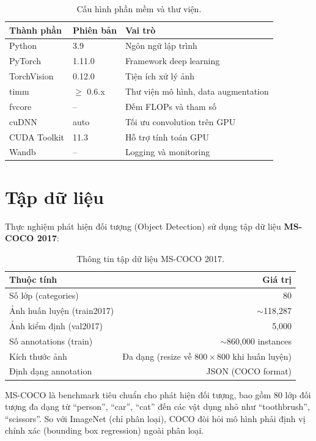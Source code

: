 \begin{table}[H]
\centering
\caption{Cấu hình phần mềm và thư viện.}
\label{tab:software}
\begin{tabular}{l l l}
\toprule
\textbf{Thành phần} & \textbf{Phiên bản} & \textbf{Vai trò} \\
\midrule
Python & 3.9 & Ngôn ngữ lập trình \\
PyTorch & 1.11.0 & Framework deep learning \\
TorchVision & 0.12.0 & Tiện ích xử lý ảnh \\
timm & $\geq$ 0.6.x & Thư viện mô hình, data augmentation \\
fvcore & -- & Đếm FLOPs và tham số \\
cuDNN & auto & Tối ưu convolution trên GPU \\
CUDA Toolkit & 11.3 & Hỗ trợ tính toán GPU \\
Wandb & -- & Logging và monitoring \\
\bottomrule
\end{tabular}
\end{table}

\section{Tập dữ liệu}
\label{sec:dataset}

Thực nghiệm phát hiện đối tượng (Object Detection) sử dụng tập dữ liệu \textbf{MS-COCO 2017}:

\begin{table}[H]
\centering
\caption{Thông tin tập dữ liệu MS-COCO 2017.}
\label{tab:dataset_coco}
\begin{tabular}{l r}
\toprule
\textbf{Thuộc tính} & \textbf{Giá trị} \\
\midrule
Số lớp (categories) & 80 \\
Ảnh huấn luyện (train2017) & $\sim$118{,}287 \\
Ảnh kiểm định (val2017) & 5{,}000 \\
Số annotations (train) & $\sim$860{,}000 instances \\
Kích thước ảnh & Đa dạng (resize về $800 \times 800$ khi huấn luyện) \\
Định dạng annotation & JSON (COCO format) \\
\bottomrule
\end{tabular}
\end{table}

MS-COCO là benchmark tiêu chuẩn cho phát hiện đối tượng, bao gồm 80 lớp đối tượng đa dạng từ ``person'', ``car'', ``cat'' đến các vật dụng nhỏ như ``toothbrush'', ``scissors''. So với ImageNet (chỉ phân loại), COCO đòi hỏi mô hình phải định vị chính xác (bounding box regression) ngoài phân loại.


